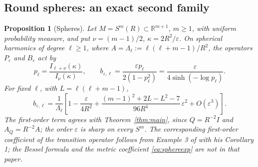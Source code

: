 \documentclass[11pt,a4paper]{article}
\newtheorem{proposition}[theorem]{Proposition}
\theoremstyle{definition}\newtheorem{definition}[theorem]{Definition}
\theoremstyle{remark}\newtheorem{remark}[theorem]{Remark}
\newcommand{\eps}{\varepsilon}
\newcommand{\R}{\mathbb R}
\begin{document}
\subsection{Round spheres: an exact second family}

\begin{proposition}[Spheres]\label{prop:sphere}
Let $M=S^m(R)\subset\R^{m+1}$, $m\ge1$, with uniform probability measure, and put $\nu=(m-1)/2$, $\kappa=2R^2/\eps$. On spherical harmonics of degree $\ell\ge1$, where $A=\Lambda_\ell:=\ell(\ell+m-1)/R^2$, the operators $P_\eps$ and $B_\eps$ act by
\begin{equation}\label{eq:spherep}
p_\ell=\frac{I_{\ell+\nu}(\kappa)}{I_\nu(\kappa)},\qquad
b_{\eps,\ell}=\frac{\eps p_\ell}{2(1-p_\ell^2)}=\frac{\eps}{4\sinh(-\log p_\ell)}.
\end{equation}
For fixed $\ell$, with $L=\ell(\ell+m-1)$,
\begin{equation}\label{eq:sphereexp}
b_{\eps,\ell}=\frac1{\Lambda_\ell}\left[1-\frac{\eps}{4R^2}+\frac{(m-1)^2+2L-L^2-7}{96R^4}\,\eps^2+O(\eps^3)\right].
\end{equation}
The first-order term agrees with Theorem~\ref{thm:main}, since $Q=R^{-2}I$ and $A_Q=R^{-2}A$; the order $\eps$ is sharp on every $S^m$. The corresponding first-order coefficient of the transition operator follows from Example 3 of \cite{Guo} with his Corollary 1; the Bessel formula and the metric coefficient \eqref{eq:sphereexp} are not in that paper.
\end{proposition}
\end{document}
